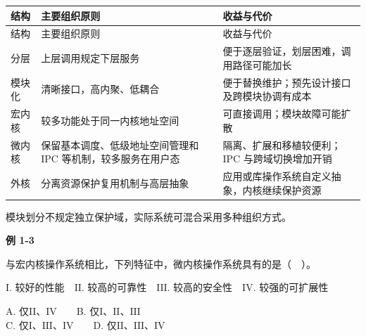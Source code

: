 \par\smallskip
\begin{wideblock}
{\fontsize{9.3}{12}\selectfont\setlength{\tabcolsep}{2.5pt}\setlength{\LTleft}{0pt}\setlength{\LTright}{0pt}
\begin{longtable}{@{}>{\raggedright\arraybackslash}p{}>{\raggedright\arraybackslash}p{}>{\raggedright\arraybackslash}p{}@{}}
\toprule
结构 & 主要组织原则 & 收益与代价 \\

\midrule\endfirsthead\toprule
结构 & 主要组织原则 & 收益与代价 \\

\midrule\endhead\bottomrule\endfoot
分层 & 上层调用规定下层服务 & 便于逐层验证，划层困难，调用路径可能加长 \\

模块化 & 清晰接口，高内聚、低耦合 & 便于替换维护；预先设计接口及跨模块协调有成本 \\

宏内核 & 较多功能处于同一内核地址空间 & 可直接调用；模块故障可能扩散 \\

微内核 & 保留基本调度、低级地址空间管理和 IPC 等机制，较多服务在用户态 & 隔离、扩展和移植较便利；IPC 与跨域切换增加开销 \\

外核 & 分离资源保护复用机制与高层抽象 & 应用或库操作系统自定义抽象，内核继续保护资源 \\

\end{longtable}}
\end{wideblock}
\par\smallskip

模块划分不规定独立保护域，实际系统可混合采用多种组织方式。

\par\medskip{}\noindent\hypertarget{OS01-E03}{}\label{OS01-E03}\textbf{例 1-3}\par\nobreak\smallskip

与宏内核操作系统相比，下列特征中，微内核操作系统具有的是（　）。

\ensuremath{\mathrm{I}}. 较好的性能　\ensuremath{\mathrm{II}}. 较高的可靠性　\ensuremath{\mathrm{III}}. 较高的安全性　\ensuremath{\mathrm{IV}}. 较强的可扩展性

A. 仅\ensuremath{\mathrm{II}}、\ensuremath{\mathrm{IV}}　　B. 仅\ensuremath{\mathrm{I}}、\ensuremath{\mathrm{II}}、\ensuremath{\mathrm{III}}\\
C. 仅\ensuremath{\mathrm{I}}、\ensuremath{\mathrm{III}}、\ensuremath{\mathrm{IV}}　　D. 仅\ensuremath{\mathrm{II}}、\ensuremath{\mathrm{III}}、\ensuremath{\mathrm{IV}}

